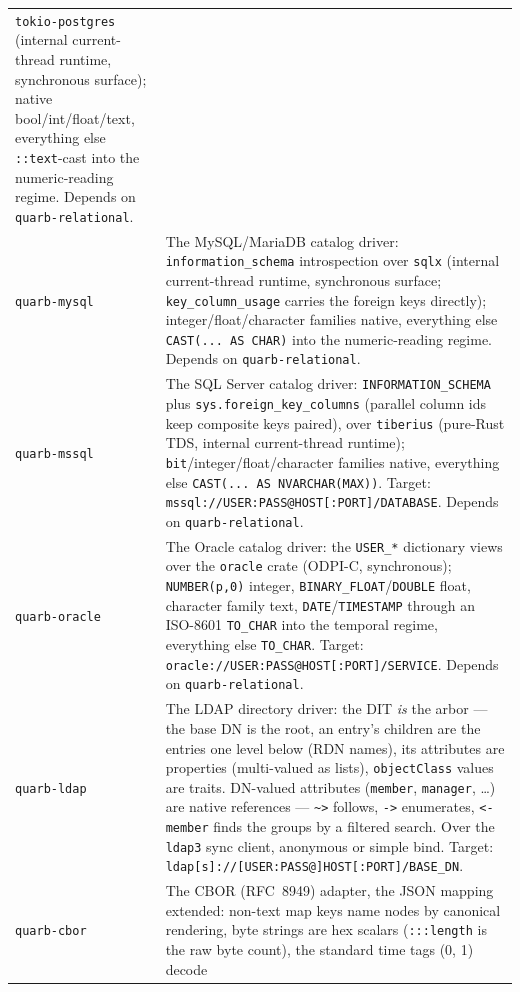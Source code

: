 \documentclass{report}
\begin{document}
\begin{xltabular}{\textwidth}{l X}
  \texttt{tokio-postgres} (internal current-thread runtime,
  synchronous surface); native bool/int/float/text, everything
  else \texttt{::text}-cast into the numeric-reading regime.
  Depends on \texttt{quarb-relational}. \\
\texttt{quarb-mysql} & The MySQL/MariaDB catalog driver:
  \texttt{information\_schema} introspection over \texttt{sqlx}
  (internal current-thread runtime, synchronous surface;
  \texttt{key\_column\_usage} carries the foreign keys
  directly); integer/float/character families native, everything
  else \texttt{CAST(... AS CHAR)} into the numeric-reading
  regime. Depends on \texttt{quarb-relational}. \\
\texttt{quarb-mssql} & The SQL Server catalog driver:
  \texttt{INFORMATION\_SCHEMA} plus \texttt{sys.foreign\_key\_columns}
  (parallel column ids keep composite keys paired), over
  \texttt{tiberius} (pure-Rust TDS, internal current-thread
  runtime); \texttt{bit}/integer/float/character families
  native, everything else \texttt{CAST(... AS NVARCHAR(MAX))}.
  Target: \texttt{mssql://USER:PASS@HOST[:PORT]/DATABASE}.
  Depends on \texttt{quarb-relational}. \\
\texttt{quarb-oracle} & The Oracle catalog driver: the
  \texttt{USER\_*} dictionary views over the \texttt{oracle}
  crate (ODPI-C, synchronous); \texttt{NUMBER(p,0)} integer,
  \texttt{BINARY\_FLOAT}/\texttt{DOUBLE} float, character
  family text, \texttt{DATE}/\texttt{TIMESTAMP} through an
  ISO-8601 \texttt{TO\_CHAR} into the temporal regime,
  everything else \texttt{TO\_CHAR}. Target:
  \texttt{oracle://USER:PASS@HOST[:PORT]/SERVICE}. Depends on
  \texttt{quarb-relational}. \\
\texttt{quarb-ldap} & The LDAP directory driver: the DIT
  \emph{is} the arbor — the base DN is the root, an entry's
  children are the entries one level below (RDN names), its
  attributes are properties (multi-valued as lists),
  \texttt{objectClass} values are traits. DN-valued attributes
  (\texttt{member}, \texttt{manager}, \dots) are native
  references — \texttt{\textasciitilde>} follows, \texttt{->}
  enumerates, \texttt{<-member} finds the groups by a filtered
  search. Over the \texttt{ldap3} sync client, anonymous or
  simple bind. Target:
  \texttt{ldap[s]://[USER:PASS@]HOST[:PORT]/BASE\_DN}. \\
\texttt{quarb-cbor} & The CBOR (RFC~8949) adapter, the JSON
  mapping extended: non-text map keys name nodes by canonical
  rendering, byte strings are hex scalars (\texttt{:::length}
  is the raw byte count), the standard time tags (0, 1) decode

\end{xltabular}
\end{document}
